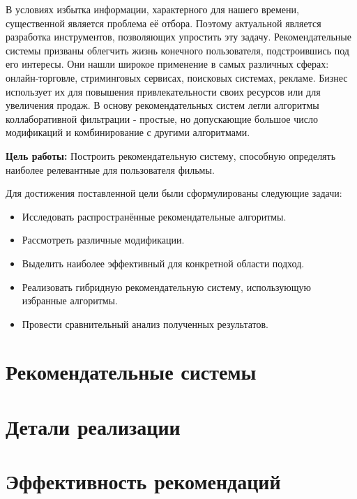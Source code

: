 \documentclass[a4paper,article,14pt]{extarticle}
\begin{document}


\tableofcontents
\pagebreak


В условиях избытка информации, характерного для нашего времени, существенной является проблема её отбора.
Поэтому актуальной является разработка инструментов, позволяющих упростить эту задачу.
Рекомендательные системы призваны облегчить жизнь конечного пользователя, подстроившись под его интересы.
Они нашли широкое применение в самых различных сферах: онлайн-торговле, стриминговых сервисах, поисковых системах, рекламе.
Бизнес использует их для повышения привлекательности своих ресурсов или для увеличения продаж.
В основу рекомендательных систем легли алгоритмы коллаборативной фильтрации - простые, но допускающие большое число модификаций и комбинирование с другими алгоритмами.


\textbf{Цель работы:} Построить рекомендательную систему, способную определять наиболее релевантные для пользователя фильмы.

Для достижения поставленной цели были сформулированы следующие задачи:
\begin{itemize}
\item Исследовать распространённые рекомендательные алгоритмы.
\item Рассмотреть различные модификации.
\item Выделить наиболее эффективный для конкретной области подход.
\item Реализовать гибридную рекомендательную систему, использующую избранные алгоритмы.
\item Провести сравнительный анализ полученных результатов.
\end{itemize}

\pagebreak
\section{Рекомендательные системы}\label{sec:recommender_systems}


\pagebreak
\section{Детали реализации}\label{sec:program_realization}


\pagebreak
\section{Эффективность рекомендаций}\label{sec:algos_efficiency}

\end{document}
